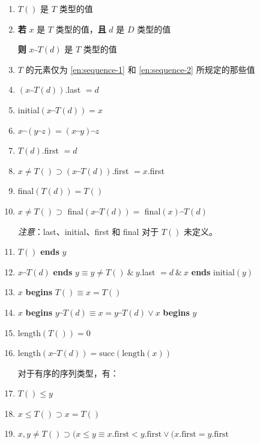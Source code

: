 \begin{enumerate}[wide, nosep, label=(\arabic*)]
	\item \label{en:sequence-1}
	$T()$ 是 $T$ 类型的值
	
	\item \label{en:sequence-2}
	\textbf{若} $x$ 是 $T$ 类型的值，\textbf{且} $d$ 是 $D$ 类型的值
	
	\qquad\quad \textbf{则} $x\wideparen{\ \ }T(d)$ 是 $T$ 类型的值

	\item $T$ 的元素仅为 \ref{en:sequence-1} 和 \ref{en:sequence-2} 所规定的那些值

	\item $(x\wideparen{\ \ }T(d))$.last $= d$

	\item initial$(x\wideparen{\ \ }T(d)) = x$
	\item $x\wideparen{\ \ }(y\wideparen{\ \ }z) = (x\wideparen{\ \ }y)\wideparen{\ \ }z$
	\item $T(d)$.first $= d$
	\item $x \neq T() \supset (x\wideparen{\ \ }T(d))$.first $= x$.first
	\item final$(T(d)) = T()$
	\item $x \neq T() \supset$ final$(x\wideparen{\ \ }T(d)) =$ final$(x)\wideparen{\ \ }T(d)$

	\noindent
	\textit{注意}：last、initial、first 和 final 对于 $T()$ 未定义。

	\item $T()$ \textbf{ends} $y$
	\item $x\wideparen{\ \ }T(d)$ \textbf{ends} $y \equiv y \neq T()\ \&\ y$.last $= d\ \&\ x$ \textbf{ends} initial$(y)$
	\item $x$ \textbf{begins} $T() \equiv x = T()$
	\item $x$ \textbf{begins} $y\wideparen{\ \ }T(d) \equiv x = y\wideparen{\ \ }T(d) \lor x$ \textbf{begins} $y$
	\item length$(T()) = 0$
	\item length$(x\wideparen{\ \ }T(d)) = \text{succ}(\text{length}(x))$

	\noindent
	对于有序的序列类型，有：

	\item $T() \leqslant y$
	\item $x \leqslant T() \supset x = T()$
	\item $x, y \neq T() \supset (x \leqslant y \equiv x.\text{first} < y.\text{first} \lor (x.\text{first} = y.\text{first}$
	

\end{enumerate}
